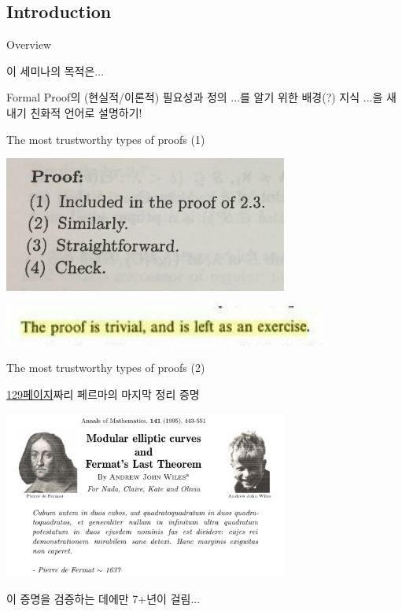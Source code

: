 \documentclass[../231120_msquare_computational-logic.tex]{subfiles}
\begin{document}
\subsection{Introduction}

\begin{frame}{Overview}
    \begin{block}{이 세미나의 목적은...}
        \begin{enumerate}
            \ii Formal Proof의 (현실적/이론적) 필요성과 정의 \pause
            \ii ...를 알기 위한 배경(?) 지식 \pause
            \ii ...을 새내기 친화적 언어로 설명하기!
        \end{enumerate}
    \end{block}
\end{frame}

\begin{frame}{The most trustworthy types of proofs (1)}
    \begin{center}
        \includegraphics[width=0.7\textwidth]{./left_to_readers1.png}
    \end{center}
    \begin{center}
        \includegraphics[width=0.8\textwidth]{./left_to_readers2.png}
    \end{center}
\end{frame}

\begin{frame}{The most trustworthy types of proofs (2)}
    \begin{center}
        {\ul{129페이지}짜리 페르마의 마지막 정리 증명}
    \end{center}
    \begin{center}
        \includegraphics[width=0.7\textwidth]{./wiles_proof.png}
    \end{center}
    \pause
    \begin{center}
        이 증명을 검증하는 데에만 7+년이 걸림...
    \end{center}
\end{frame}
\end{document}
